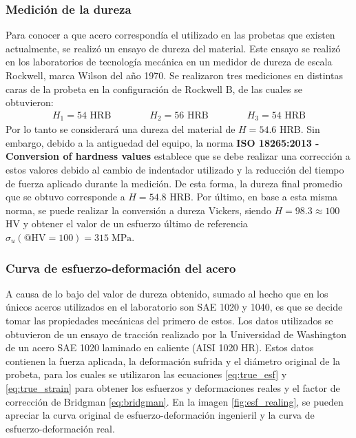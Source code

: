 \subsubsection{Medición de la dureza}
Para conocer a que acero correspondía el utilizado en las probetas que existen actualmente, se realizó un ensayo de dureza del material. Este ensayo se realizó en los laboratorios de tecnología mecánica en un medidor de dureza de escala Rockwell, marca Wilson del año 1970. Se realizaron tres mediciones en distintas caras de la probeta en la configuración de Rockwell B, de las cuales se obtuvieron:
\begin{gather*}
	H_1 = 54 \text{ HRB} \qquad \qquad H_2 = 56 \text{ HRB} \qquad \qquad H_3 = 54 \text{ HRB}
\end{gather*}
Por lo tanto se considerará una dureza del material de $H = 54.6$ HRB. Sin embargo, debido a la antiguedad del equipo, la norma \textbf{ISO 18265:2013 - Conversion of hardness values} \cite{ISO18265} establece que se debe realizar una corrección a estos valores debido al cambio de indentador utilizado y la reducción del tiempo de fuerza aplicado durante la medición. De esta forma, la dureza final promedio que se obtuvo corresponde a $H = 54.8$ HRB. Por último, en base a esta misma norma, se puede realizar la conversión a dureza Vickers, siendo $H = 98.3 \approx 100$ HV y obtener el valor de un esfuerzo último de referencia $\sigma_u(\texttt{@}\text{HV}=100) = 315 \; \text{MPa}$.

\subsubsection{Curva de esfuerzo-deformación del acero}
A causa de lo bajo del valor de dureza obtenido, sumado al hecho que en los únicos aceros utilizados en el laboratorio son SAE 1020 y 1040, es que se decide tomar las propiedades mecánicas del primero de estos. Los datos utilizados se obtuvieron de un ensayo de tracción realizado por la Universidad de Washington de un acero SAE 1020 laminado en caliente (AISI 1020 HR)\cite{1020data}. Estos datos contienen la fuerza aplicada, la deformación sufrida y el diámetro original de la probeta, para los cuales se utilizaron las ecuaciones \ref{eq:true_esf} y \ref{eq:true_strain} para obtener los esfuerzos y deformaciones reales y el factor de corrección de Bridgman \ref{eq:bridgman}. En la imagen \ref{fig:esf_realing}, se pueden apreciar la curva original de esfuerzo-deformación ingenieril y la curva de esfuerzo-deformación real. 

